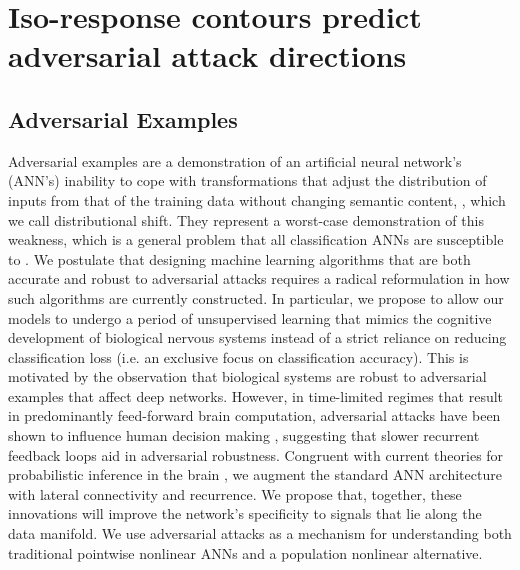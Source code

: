 \section{Iso-response contours predict adversarial attack directions}\label{sec:ch4_adv_defense}

\subsection{Adversarial Examples}
Adversarial examples are a demonstration of an artificial neural network's (ANN’s) inability to cope with transformations that adjust the distribution of inputs from that of the training data without changing semantic content, \parencite{ford2019adversarial}, which we call distributional shift. They represent a worst-case demonstration of this weakness, which is a general problem that all classification ANNs are susceptible to \parencite{hendrycks2018benchmarking}. We postulate that designing machine learning algorithms that are both accurate and robust to adversarial attacks requires a radical reformulation in how such algorithms are currently constructed. In particular, we propose to allow our models to undergo a period of unsupervised learning that mimics the cognitive development of biological nervous systems instead of a strict reliance on reducing classification loss (i.e. an exclusive focus on classification accuracy). This is motivated by the observation that biological systems are robust to adversarial examples that affect deep networks. However, in time-limited regimes that result in predominantly feed-forward brain computation, adversarial attacks have been shown to influence human decision making \parencite{elsayed2018adversarial}, suggesting that slower recurrent feedback loops aid in adversarial robustness. Congruent with current theories for probabilistic inference in the brain \parencite{lee2003hierarchical}, we augment the standard ANN architecture with lateral connectivity and recurrence. We propose that, together, these innovations will improve the network’s specificity to signals that lie along the data manifold. We use adversarial attacks as a mechanism for understanding both traditional pointwise nonlinear ANNs and a population nonlinear alternative.

